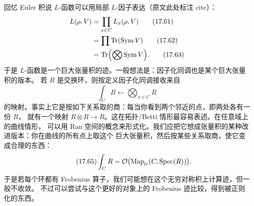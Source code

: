 回忆 Euler 积说 $L$-函数可以用局部 $L$-因子表达（原文此处标注 cite）：
\begin{align}
L(\rho,V)&=\prod_{x\in C}L_x(\rho,V)\tag{17.61}\label{eq:17.61}\\
&=\prod\operatorname{Tr}(\operatorname{Sym}V)\tag{17.62}\label{eq:17.62}\\
&=\operatorname{Tr}\Bigl(\bigotimes\operatorname{Sym}V\Bigr).\tag{17.63}\label{eq:17.63}
\end{align}
于是 $L$-函数是一个巨大张量积的迹。一般想法是：因子化同调也是某个巨大张量积的版本。
若 $R$ 是交换环，则按定义因子化同调接收来自
\begin{equation}\tag{17.64}\label{eq:17.64}
\int_C R\leftarrow\bigotimes_{x\in C}R
\end{equation}
的映射。事实上它是按如下关系取的商：每当你看到两个邻近的点，即两处各有一份 $R$，
就有一个映射 $R\otimes R\to R$。这在拓扑/Betti 情形最容易表述。在任意域上的曲线情形，
可以用 Ran 空间的概念来形式化。我们应把它想成张量积的某种改进版本：你在曲线的所有点上取这个
巨大张量积，然后按某些关系取商，使它变成合理的东西：
\begin{equation}\tag{17.65}\label{eq:17.65}
\int_C R=\mathcal{O}\bigl(\operatorname{Map}_{lc}(C,\mathrm{Spec}(R))\bigr).
\end{equation}
于是若每个环都有 Frobenius 算子，我们可能想在这个无穷对称积上计算迹，但一般不收敛。
不过可以尝试与这个更好的对象上的 Frobenius 迹比较，得到被正则化的东西。

